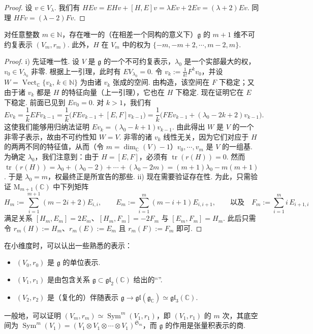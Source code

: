 \begin{proof}
设 $v\in V_\lambda$. 我们有 $HEv=EHv+[H,E]v=\lambda Ev+2Ev=(\lambda+2)Ev$. 同理 $HFv=(\lambda-2)Fv$.
\end{proof}

\begin{proposition*}
对任意整数 $m\in\mathbb N$，存在唯一的（在相差一个同构的意义下）$\mathfrak{g}$ 的 $m+1$ 维不可约复表示 $(V_m,r_m)$. 此外，$H$ 在 $V_m$ 中的权为 $\{-m,-m+2,\cdots,m-2,m\}$.
\end{proposition*}

\begin{proof}
i) 先证唯一性. 设 $V$ 是 $\mathfrak{g}$ 的一个不可约复表示，$\lambda_0$ 是一个实部最大的权，$v_0\in V_{\lambda_0}$ 非零. 根据上一引理，此时有 $EV_{\lambda_0}=0$.
令 $v_k:=\frac{1}{k!}F^k v_0$，并设 $W=\operatorname{Vect}_{\mathbb C}\{v_k,\,k\in\mathbb N\}$ 为由诸 $v_k$ 张成的空间. 由构造，该空间在 $F$ 下稳定；又由于诸 $v_k$ 都是 $H$ 的特征向量（上一引理），它也在 $H$ 下稳定. 现在证明它在 $E$ 下稳定. 前面已见到 $Ev_0=0$. 对 $k>1$，我们有
\[
Ev_k=\frac{1}{k}EFv_{k-1}=\frac{1}{k}\bigl(FEv_{k-1}+[E,F]v_{k-1}\bigr)=\frac{1}{k}\bigl(FEv_{k-1}+(\lambda_0-2k+2)v_{k-1}\bigr).
\]
这使我们能够用归纳法证明 $Ev_k=(\lambda_0-k+1)v_{k-1}$.
由此得出 $W$ 是 $V$ 的一个非零子表示，故由不可约性知 $W=V$. 非零的诸 $v_k$ 线性无关，因为它们对应于 $H$ 的两两不同的特征值，从而（令 $m=\dim_{\mathbb C}(V)-1$）$v_0,\cdots,v_m$ 是 $V$ 的一组基.
为确定 $\lambda_0$，我们注意到：由于 $H=[E,F]$，必须有 $\operatorname{tr}(r(H))=0$. 然而 $\operatorname{tr}(r(H))=\lambda_0+(\lambda_0-2)+\cdots+(\lambda_0-2m)=(m+1)\lambda_0-m(m+1)$. 于是 $\lambda_0=m$，权最终正是所宣告的那些.
ii) 现在需要验证存在性. 为此，只需验证 $\mathrm{M}_{m+1}(\mathbb C)$ 中下列矩阵
\[
H_m:=\sum_{i=1}^{m+1}(m-2i+2)E_{i,i},\qquad
E_m:=\sum_{i=1}^{m}(m-i+1)E_{i,i+1},\qquad\text{以及}\quad
F_m:=\sum_{i=1}^{m}i\,E_{i+1,i}
\]
满足关系 $[H_m,E_m]=2E_m$、$[H_m,F_m]=-2F_m$ 与 $[E_m,F_m]=H_m$. 此后只需令 $r_m(H):=H_m$、$r_m(E):=E_m$ 且 $r_m(F):=F_m$ 即可.
\end{proof}

\begin{remark*}
在小维度时，可以认出一些熟悉的表示：
\begin{itemize}[label=--]
\item $(V_0,r_0)$ 是 $\mathfrak{g}$ 的单位表示.
\item $(V_1,r_1)$ 是由包含关系 $\mathfrak{g}\subset\mathfrak{gl}_2(\mathbb C)$ 给出的``''.
\item $(V_2,r_2)$ 是（复化的）伴随表示 $\mathfrak{g}\longrightarrow\mathfrak{gl}(\mathfrak{g}_{\mathbb C})\simeq\mathfrak{gl}_3(\mathbb C)$.
\end{itemize}
一般地，可以证明 $(V_m,r_m)\simeq\operatorname{Sym}^m(V_1,r_1)$，即 $(V_1,r_1)$ 的 $m$ 次，其底空间为 $\operatorname{Sym}^m(V_1)=(V_1\otimes V_1\otimes\cdots\otimes V_1)^{\mathfrak{S}_m}$，而 $\mathfrak{g}$ 的作用是张量积表示的商.
\end{remark*}

